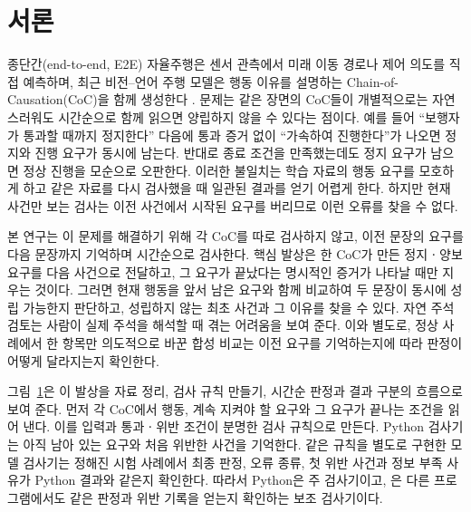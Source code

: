 \section{서론}
\label{sec:intro}

종단간(end-to-end, E2E) 자율주행은 센서 관측에서 미래 이동 경로나 제어 의도를 직접 예측하며, 최근 비전--언어 주행 모델은 행동 이유를 설명하는 Chain-of-Causation(CoC)을 함께 생성한다 \cite{hu2023uniad,jiang2023vad,sima2024drivelm,tian2024drivevlm,wang2025alpamayo}. 문제는 같은 장면의 CoC들이 개별적으로는 자연스러워도 시간순으로 함께 읽으면 양립하지 않을 수 있다는 점이다. 예를 들어 ``보행자가 통과할 때까지 정지한다'' 다음에 통과 증거 없이 ``가속하여 진행한다''가 나오면 정지와 진행 요구가 동시에 남는다. 반대로 종료 조건을 만족했는데도 정지 요구가 남으면 정상 진행을 모순으로 오판한다. 이러한 불일치는 학습 자료의 행동 요구를 모호하게 하고 같은 자료를 다시 검사했을 때 일관된 결과를 얻기 어렵게 한다. 하지만 현재 사건만 보는 검사는 이전 사건에서 시작된 요구를 버리므로 이런 오류를 찾을 수 없다.

본 연구는 이 문제를 해결하기 위해 각 CoC를 따로 검사하지 않고, 이전 문장의 요구를 다음 문장까지 기억하며 시간순으로 검사한다. 핵심 발상은 한 CoC가 만든 정지ㆍ양보 요구를 다음 사건으로 전달하고, 그 요구가 끝났다는 명시적인 증거가 나타날 때만 지우는 것이다. 그러면 현재 행동을 앞서 남은 요구와 함께 비교하여 두 문장이 동시에 성립 가능한지 판단하고, 성립하지 않는 최초 사건과 그 이유를 찾을 수 있다. 자연 주석 검토는 사람이 실제 주석을 해석할 때 겪는 어려움을 보여 준다. 이와 별도로, 정상 사례에서 한 항목만 의도적으로 바꾼 합성 비교는 이전 요구를 기억하는지에 따라 판정이 어떻게 달라지는지 확인한다.

\begin{figure}[t]
\centering

\label{fig:overview-pipeline}
\end{figure}

그림~\ref{fig:overview-pipeline}은 이 발상을 자료 정리, 검사 규칙 만들기, 시간순 판정과 결과 구분의 흐름으로 보여 준다. 먼저 각 CoC에서 행동, 계속 지켜야 할 요구와 그 요구가 끝나는 조건을 읽어 낸다. 이를 입력과 통과ㆍ위반 조건이 분명한 검사 규칙으로 만든다. Python 검사기는 아직 남아 있는 요구와 처음 위반한 사건을 기억한다. 같은 규칙을 별도로 구현한 \uppaal{} 모델 검사기는 정해진 시험 사례에서 최종 판정, 오류 종류, 첫 위반 사건과 정보 부족 사유가 Python 결과와 같은지 확인한다. 따라서 Python은 주 검사기이고, \uppaal{}은 다른 프로그램에서도 같은 판정과 위반 기록을 얻는지 확인하는 보조 검사기이다.


